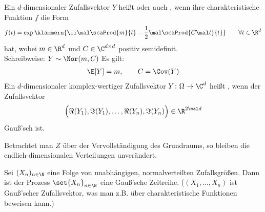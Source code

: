 \begin{defi}
	Ein $d$-dimensionaler Zufallsvektor $Y$ heißt  oder auch , wenn ihre charakteristische Funktion $f$ die Form
	\begin{align*}
		f(t)=\exp\klammern{\ii\mal\scaProd{m}{t}-\frac{1}{2}\mal\scaProd{C\mal t}{t}}\qquad\forall t\in\R^d
	\end{align*}
	hat, wobei $m\in\R^d$ und $C\in\C^{d\times d}$ positiv semidefinit.\\
	Schreibweise: $Y\sim\Nor(m,C)$ Es gilt:
	\begin{align*}
		\E[Y]=m,\qquad C=\Cov(Y)
	\end{align*}
	Ein $d$-dimensionaler komplex-wertiger Zufallsvektor $Y\colon\Omega\to\C^d$ heißt , wenn der Zufallsvektor
	\begin{align*}
		\Big(\Re(Y_1),\Im(Y_1),\ldots,\Re(Y_n),\Im(Y_n)\Big)\in\R^{2\mal d}
	\end{align*}
	Gauß'sch ist.
\end{defi}


\begin{bemerkung}
	Betrachtet man $Z$ über der Vervollständigung des Grundraums, so bleiben die endlich-dimensionalen Verteilungen unverändert.
\end{bemerkung}

\begin{beisp}
	Sei $(X_n)_{n\in\N}$ eine Folge von unabhängigen, normalverteilten Zufallsgrößen.
	Dann ist der Prozess $\set{X_n}_{n\in\N}$ eine Gauß'sche Zeitreihe.
	($(X_1,\ldots,X_n)$ ist Gauß'scher Zufallsvektor, was man z.B. über charakteristische Funktionen beweisen kann.)
\end{beisp}

